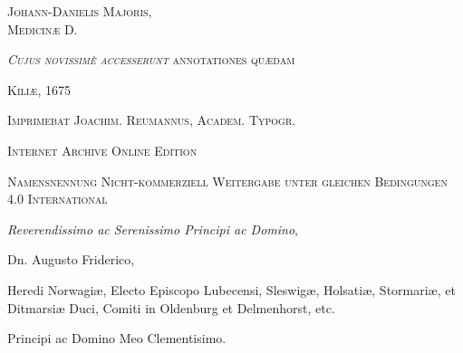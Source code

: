 \documentclass[a4paper, 11pt, oneside, polutonikogreek, german]{article}
\begin{document}
\begin{titlepage}
        {\scshape \Large Johann-Danielis Majoris,\\\normalsize Medicinæ D. } %
	
	\vspace*{1\baselineskip} %
	
        {\scshape \normalsize \emph{Cujus novissimè accesserunt} annotationes quædam} %

        \vspace*{\fill}

	\vspace{1\baselineskip}

	{\small\scshape Kiliæ, 1675}
	
	{\small\scshape{Imprimebat Joachim. Reumannus, Academ. Typogr.}}
	
	\vspace{0.5\baselineskip} %

        \scshape Internet Archive Online Edition%
    
	{\scshape\small Namensnennung Nicht-kommerziell Weitergabe unter gleichen Bedingungen 4.0 International} %
\end{titlepage}
\setlength{\parskip}{1mm plus1mm minus1mm}
\clearpage
\tableofcontents
\clearpage
\begin{center}
\emph{Reverendissimo ac Serenissimo Principi ac Domino},

Dn. Augusto Friderico,

{\footnotesize Heredi Norwagiæ, Electo Episcopo Lubecensi, Sleswigæ, Holsatiæ, Stormariæ, et Ditmarsiæ Duci, Comiti in Oldenburg et Delmenhorst, etc.}

Principi ac Domino Meo Clementisimo.
\end{center}
\end{document}
